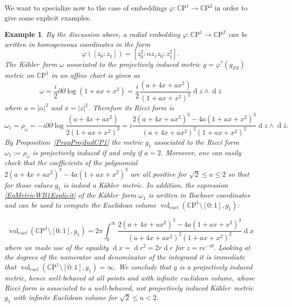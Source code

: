 \documentclass[12pt]{amsart}
\newcommand{\CP}{\mathbb{C}\mathrm{P}}
\newcommand{\de}{\partial}
\newcommand{\K}{K\"{a}hler}
\newcommand{\ov}[1]{\overline{#1}}
\newcommand{\deb}{\ov\partial}
\newcommand{\di}{{\operatorname{d}}}
\newcommand{\vol}{{\operatorname{vol}}}
\newcommand{\lra}{\longrightarrow}
\newtheorem{ex}{Example}
\begin{document}
We want to specialize now to the case of embeddings $\varphi:\CP^1\lra\CP^2$ in order to give some explicit examples. 
\begin{ex}\label{ExPIntoWB}\rm
	By the discussion above, a radial embedding $\varphi:\CP^1\lra\CP^2$ can be written in homogeneous coordinates in the form
	$$\varphi([z_0:z_1])=[z_0^2:\alpha z_1z_0:z_1^2].$$
	The \K\ form $\omega$ associated to the projectively induced metric $g=\varphi^*(g_{FS})$ metric on $\CP^1$ in an affine chart is given as
	\begin{equation}\label{EqMetricProjInducedCP2}
		\omega=\dfrac{i}{2}\de\deb\log(1+ax+x^2)=\dfrac{i}{2}\dfrac{(a+4x+ax^2)}{(1+ax+x^2)^2}\di z\wedge\di\bar{z}
	\end{equation}
	where $a=\vert\alpha\vert^2$ and $x=\vert z\vert^2$. 
	Therefore its Ricci form is
	\begin{equation}\label{EqMetricWB1Explicit}
		\omega_1=\rho_\omega=-i\de\deb\log\dfrac{(a+4x+ax^2)}{2(1+ax+x^2)^2}=i\dfrac{2(a+4x+ax^2)^3-4a(1+ax+x^2)^3}{(a+4x+ax^2)^2(1+ax+x^2)^2}\di z\wedge\di\bar{z}.
	\end{equation}
	By Proposition~\ref{PropProjIndCP1} the metric $g_1$ associated to the Ricci form $\omega_1:=\rho_\omega$ is projectively induced if and only if $a=2$. 
	Moreover, one can easily check that the coefficients of the polynomial $2(a+4x+ax^2)^3-4a(1+ax+x^2)^3$ are all positive for $\sqrt{2}\leq a\leq2$ so that for those values $g_1$ is indeed a \K\ metric.
	In addition, the expression \eqref{EqMetricWB1Explicit} of the \K\ form $\omega_1$ is written in Bochner coordinates and can be used to compute the Euclidean volume $\vol_{eucl}(\CP^1\setminus [0:1], g_1)
	$:
	
	$$\vol_{eucl}(\CP^1\setminus [0:1], g_1)=2\pi\int_{0}^\infty\dfrac{2(a+4x+ax^2)^3-4a(1+ax+x^2)^3}{(a+4x+ax^2)^2(1+ax+x^2)^2}\di x$$
	where we made use of the equality $\di x=\di r^2=2r\di r$ for $z=re^{-i\theta}$. Looking at the degrees of the numerator and denominator of the integrand it is immediate that $\vol_{eucl}(\CP^1\setminus [0:1], g_1)=\infty$.
	We conclude that $g$ is a projectively induced metric, hence well-behaved at all points and with infinite euclidean volume, whose Ricci form is associated to a well-behaved, not projectively induced \K\ metric $g_1$ with infinite Euclidean volume for $\sqrt{2}\leq a<2$.
	

\end{ex}
\end{document}
